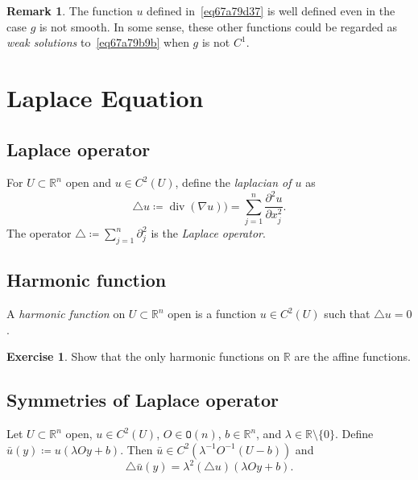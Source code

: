 \documentclass[a4paper,9pt]{amsart}
\newcommand{\R}{\mathbb{R}}	%
\newcommand{\de}{\partial}		%
\renewcommand{\div}{\operatorname{div}}	%
\newcommand{\Orth}{\mathtt{O}} %
\newcommand{\laplacian}{\triangle}
\newcommand{\grad}{\nabla}
\theoremstyle{plain}
\theoremstyle{definition}
\newtheorem{remark}[proposition]{Remark}
\newtheorem{exercise}[proposition]{Exercise}%
\theoremstyle{remark}
\begin{document}
\begin{remark}
	The function $u$ defined in~\eqref{eq67a79d37} is well defined even in the case $g$ is not smooth.
	In some sense, these other functions could be regarded as \emph{weak solutions} to~\eqref{eq67a79b9b} when $g$ is not $C^1$.
\end{remark}

\newpage
\section{Laplace Equation}

\subsection{Laplace operator}\label{subs67b9d4b5}

For $U\subset\R^n$ open and $u\in C^2(U)$, define the \emph{laplacian of $u$} as
\begin{equation}
	\laplacian u \coloneqq \div(\grad u)) = \sum_{j=1}^n \frac{\de^2 u}{\de x_j^2} .
\end{equation}
The operator $\laplacian \coloneqq \sum_{j=1}^n \de_j^2$ is the \emph{Laplace operator}.

\subsection{Harmonic function}\label{subs67b9d542}

A \emph{harmonic function} on $U\subset\R^n$ open is a function $u\in C^2(U)$ such that $\laplacian u=0$.

\begin{exercise}\label{ex68347bbd}
	Show that the only harmonic functions on $\R$ are the affine functions.
\end{exercise}

\subsection{Symmetries of Laplace operator}\label{subs67b9d638}
Let $U\subset\R^n$ open, $u\in C^2(U)$, $O\in\Orth(n)$, $b\in\R^n$, and $\lambda\in\R\setminus\{0\}$.
Define $\bar u(y) \coloneqq u(\lambda Oy+b)$.
Then $\bar u\in C^2(\lambda^{-1}O^{-1}(U-b))$ and
\begin{equation}
	\laplacian\bar u(y) = \lambda^2 (\laplacian u)(\lambda Oy+b).
\end{equation}
\end{document}
